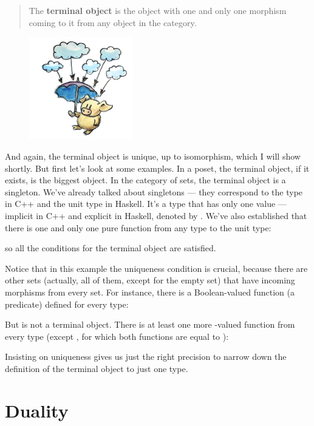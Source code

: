 \begin{quote}
The \textbf{terminal object} is the object with one and only one
morphism coming to it from any object in the category.
\end{quote}

\begin{figure}[H]
\centering
\includegraphics[width=0.4\textwidth]{images/final.jpg}
\end{figure}

\noindent
And again, the terminal object is unique, up to isomorphism, which I
will show shortly. But first let's look at some examples. In a poset,
the terminal object, if it exists, is the biggest object. In the
category of sets, the terminal object is a singleton. We've already
talked about singletons --- they correspond to the  type in
C++ and the unit type \code{()} in Haskell. It's a type that has only
one value --- implicit in C++ and explicit in Haskell, denoted by
\code{()}. We've also established that there is one and only one pure
function from any type to the unit type:

so all the conditions for the terminal object are satisfied.

Notice that in this example the uniqueness condition is crucial, because
there are other sets (actually, all of them, except for the empty set)
that have incoming morphisms from every set. For instance, there is a
Boolean-valued function (a predicate) defined for every type:

But  is not a terminal object. There is at least one more
-valued function from every type (except , for which both functions are equal to ):

Insisting on uniqueness gives us just the right precision to narrow down
the definition of the terminal object to just one type.

\section{Duality}

